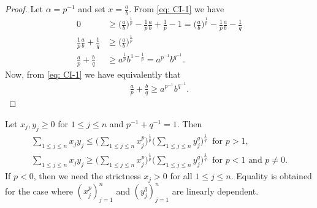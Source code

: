 \begin{proof}
    Let \(\alpha = p^{-1}\) and set \(x = \frac a b\). From \cref{eq: CI-1} we
    have
    \begin{align*}
        0 & \geq \Big(\frac a b\Big)^{\frac 1 p} - \frac 1 p \frac a b + \frac 1 p
        - 1 = \Big(\frac a b \Big)^{\frac 1 p} - \frac 1 p \frac a b - \frac 1 q
        \\
        \frac 1 p \frac a b + \frac 1 q
          & \geq \Big( \frac a b \Big)^{\frac 1 p}
        \\
        \frac a p + \frac b q
          & \geq a^{\frac 1 p} b^{1 - \frac 1 p} = a^{p^{-1}} b^{q^{-1}}.
    \end{align*}
    Now, from \cref{eq: CI-1} we have equivalently that
    \begin{align*}
        \frac a p + \frac b q \geq a^{p^{-1}} b^{q^{-1}}.
    \end{align*}
\end{proof}

\begin{proposition}\label{prop: holder-ineq}
    Let \(x_j, y_j \geq 0\) for \(1 \leq j \leq n\) and \(p^{-1} + q^{-1} = 1\).
    Then
    \begin{gather}
        \label{eq: holder-1}
        \sum_{1 \leq j \leq n} x_j y_j \leq \Big( \sum_{1 \leq j \leq n} x_j^p
        \Big)^{\frac 1 p} \Big( \sum_{1 \leq j \leq n} y_j^q \Big)^{\frac 1 q}\
        \text{ for } p > 1, \\
        \label{eq: holder-2}
        \sum_{1 \leq j \leq n} x_j y_j \geq \Big( \sum_{1 \leq j \leq n} x_j^p
        \Big)^{\frac 1 p} \Big( \sum_{1 \leq j \leq n} y_j^q \Big)^{\frac 1 q}\
        \text{ for } p < 1 \text{ and } p \neq 0.
    \end{gather}
    If \(p < 0\), then we need the strictness \(x_j > 0\) for all \(1 \leq j \leq
    n\). Equality is obtained for the case where \((x_j^p)_{j=1}^n\) and
    \((y_j^q)_{j=1}^n\) are linearly dependent.
\end{proposition}

